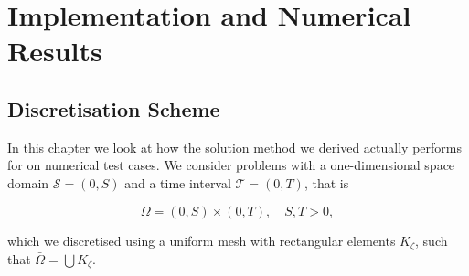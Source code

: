 \documentclass[../draft_1.tex]{subfiles}
\begin{document}
\chapter{Implementation and Numerical Results}

\section{Discretisation Scheme}
In this chapter we look at how the solution method we derived actually performs for on numerical test cases. We consider problems with a one-dimensional space domain $\mathcal{S} = (0, S)$ and a time interval $\mathcal{T} = (0,T)$, that is 
\begin{ceqn}
\begin{equation}
\Omega = (0, S) \times (0, T), \quad S,T > 0,
\end{equation}
\end{ceqn}
which we discretised using a uniform mesh with rectangular elements $K_{\zeta}$, such that $\bar{\Omega} = \bigcup K_{\zeta}$. 

\begin{figure}[ht!]
	\centering
	
	\label{fig:space_time_grid}
\end{figure}
\end{document}

